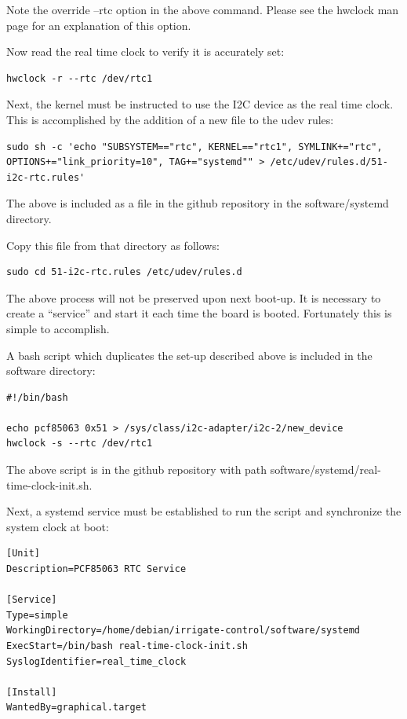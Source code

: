 Note the override --rtc option in the above command.  Please see the hwclock man page for an explanation of this option.

Now read the real time clock to verify it is accurately set:

\begin{verbatim}
hwclock -r --rtc /dev/rtc1
\end{verbatim}

Next, the kernel must be instructed to use the I2C device as the real time clock.  This is accomplished by the addition of a new file to the udev rules:

\begin{verbatim}
sudo sh -c 'echo "SUBSYSTEM=="rtc", KERNEL=="rtc1", SYMLINK+="rtc", OPTIONS+="link_priority=10", TAG+="systemd"" > /etc/udev/rules.d/51-i2c-rtc.rules'
\end{verbatim}

The above is included as a file in the github repository in the software/systemd directory.

Copy this file from that directory as follows:

\begin{verbatim}
sudo cd 51-i2c-rtc.rules /etc/udev/rules.d
\end{verbatim}

The above process will not be preserved upon next boot-up.  It is necessary to create a ``service'' and start it each time the board is booted.  Fortunately this is simple to accomplish.

A bash script which duplicates the set-up described above is included in the software directory:

\begin{verbatim}
#!/bin/bash

echo pcf85063 0x51 > /sys/class/i2c-adapter/i2c-2/new_device
hwclock -s --rtc /dev/rtc1
\end{verbatim}

The above script is in the github repository with path software/systemd/real-time-clock-init.sh.

Next, a systemd service must be established to run the script and synchronize the system clock at boot:

\begin{verbatim}
[Unit]
Description=PCF85063 RTC Service

[Service]
Type=simple
WorkingDirectory=/home/debian/irrigate-control/software/systemd
ExecStart=/bin/bash real-time-clock-init.sh
SyslogIdentifier=real_time_clock

[Install]
WantedBy=graphical.target
\end{verbatim}

